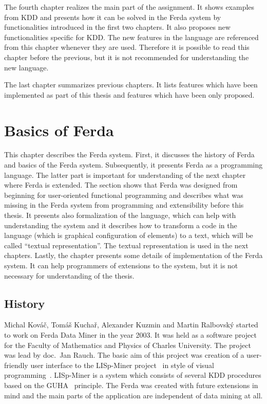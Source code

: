 \documentclass[a4paper,12pt]{book}
\begin{document}
The fourth chapter realizes the main part of the assignment. It shows examples from KDD and presents how it can be solved in the Ferda system by functionalities introduced in the first two chapters. It also proposes new functionalities specific for KDD. The new features in the language are referenced from this chapter whenever they are used. Therefore it is possible to read this chapter before the previous, but it is not recommended for understanding the new language.

The last chapter summarizes previous chapters. It lists features which have been implemented as part of this thesis and features which have been only proposed.

\chapter{Basics of Ferda}
This chapter describes the Ferda system. First, it discusses the history of Ferda and basics of the Ferda system. Subsequently, it presents Ferda as a programming language. The latter part is important for understanding of the next chapter where Ferda is extended. The section shows that Ferda was designed from beginning for user-oriented functional programming and describes what was missing in the Ferda system from programming and extensibility before this thesis. It presents also formalization of the language, which can help with understanding the system and it describes how to transform a code in the language (which is graphical configuration of elements) to a text, which will be called ``textual representation''. The textual representation is used in the next chapters. Lastly, the chapter presents some details of implementation of the Ferda system. It can help programmers of extensions to the system, but it is not necessary for understanding of the thesis. 

\section{History}
Michal Kováč, Tomáš Kuchař, Alexander Kuzmin and Martin Ralbovský started to work on Ferda Data Miner in the year 2003. It was held as a software project for the Faculty of Mathematics and Physics of Charles University. The project was lead by doc.~Jan Rauch. The basic aim of this project was creation of a user-friendly user interface to the LISp-Miner project~\cite{LISp-Miner} in style of visual programming~\cite{WikiVisualProgrammingLaguage}. LISp-Miner is a system which consists of several KDD procedures based on the GUHA~\cite{GUHAbook} principle. The Ferda was created with future extensions in mind and the main parts of the application are independent of data mining at all.
\end{document}
